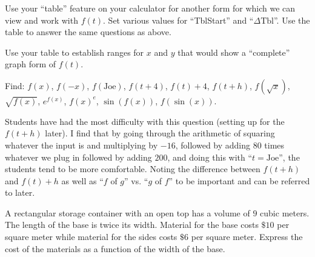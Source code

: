 \documentclass{ximera}
\begin{document}
\begin{question} 
Use your ``table'' feature on your calculator for another form for which we can view and work with $f(t)$.  Set various values for ``TblStart'' and ``$\Delta \text{Tbl}$''.  Use the table to answer the same questions as above.
\end{question}

\begin{question} 
Use your table to establish ranges for $x$ and $y$ that would show a ``complete'' graph form of $f(t)$.
\end{question}
\begin{question} 
Find:   $f(x)$, $f(-x)$, $f(\text{Joe})$, $f(t+4)$, $f(t) + 4$, $f(t+h)$, $f(\sqrt{x})$, $\sqrt{f(x)}$, $e^{f(x)}$, $f(x)^e$, $\sin(f(x))$, $f(\sin(x))$.
\begin{instructorNotes}
Students have had the most difficulty with this question (setting up for the $f(t + h)$ later).  I find that by going through the arithmetic of squaring whatever the input is and multiplying by $-16$, followed by adding $80$ times whatever we plug in followed by adding $200$, and doing this with ``$t = \text{Joe}$'', the students tend to be more comfortable.  Noting the difference between $f(t + h)$ and $f(t) + h$ as well as ``$f$ of $g$'' vs. ``$g$ of $f$'' to be important and can be referred to later.
\end{instructorNotes}
\end{question}


\begin{question} 
A rectangular storage container with an open top has a volume of $9$ cubic meters.  The length of the base is twice its width.  Material for the base costs $\$10$ per square meter while material for the sides costs $\$6$ per square meter.  Express the cost of the materials as a function of the width of the base.
\end{question}
\end{document}

